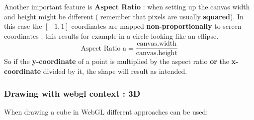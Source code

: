 Another important feature is \textbf{Aspect Ratio} : when setting up the canvas width and height might be different ( remember that pixels are usually \textbf{squared}). In this case the $[-1,1]$ coordinates are mapped \textbf{non-proportionally} to screen coordinates  : this results for example in a circle looking like an ellipse.\\
$$ \text{Aspect Ratio a} = \frac{\text{canvas.width}}{\text{canvas.height}}$$
So if the \textbf{y-coordinate} of a point is multiplied by the aspect ratio \textbf{or} the \textbf{x-coordinate} divided by it, the shape will result as intended.

\subsubsection{Drawing with webgl context : 3D}
When drawing a cube in WebGL different approaches can be used:
